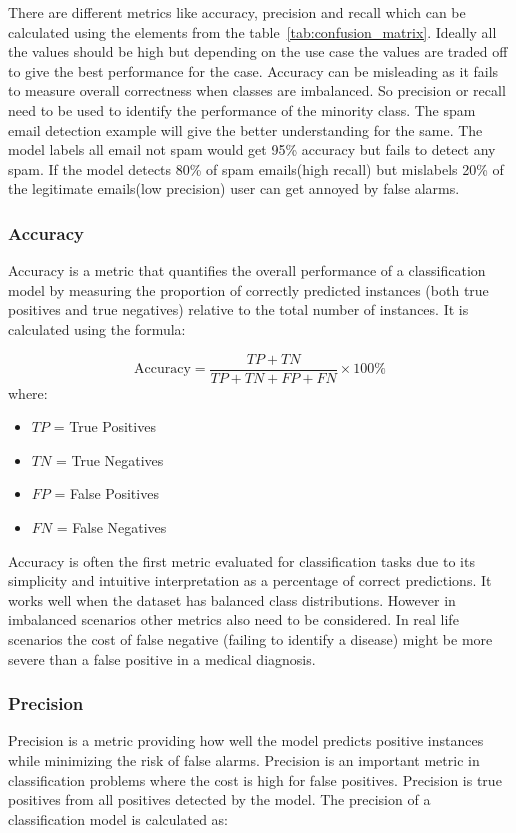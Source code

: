   There are different metrics like accuracy, precision and recall which can be calculated using the elements from the table~\ref{tab:confusion_matrix}. Ideally all the values should be high but depending on the use case the values are traded off to give the best performance for the case. Accuracy can be misleading as it fails to measure overall correctness when classes are imbalanced. So precision or recall need to be used to identify the performance of the minority class. The spam email detection example will give the better understanding for the same. The model labels all email not spam would get 95\% accuracy but fails to detect any spam. If the model detects 80\% of spam emails(high recall) but mislabels 20\% of the legitimate emails(low precision) user can get annoyed by false alarms. 

  \subsubsection{Accuracy}
  Accuracy is a metric that quantifies the overall performance of a classification model by measuring the proportion of correctly predicted instances (both true positives and true negatives) relative to the total number of instances. It is calculated using the formula:

  \begin{equation}
    \text{Accuracy} = \frac{TP + TN}{TP + TN + FP + FN} \times 100\%
    \label{eq:accuracy}
  \end{equation}
  where:
  \begin{itemize}
    \item $TP$ = True Positives
    \item $TN$ = True Negatives
    \item $FP$ = False Positives
    \item $FN$ = False Negatives
  \end{itemize}

  Accuracy is often the first metric evaluated for classification tasks due to its simplicity and intuitive interpretation as a percentage of correct predictions. It works well when the dataset has balanced class distributions. However in imbalanced scenarios other metrics also need to be considered. In real life scenarios the cost of false negative (failing to identify a disease) might be more severe than a false positive in a medical diagnosis.

  \subsubsection{Precision}
  Precision is a metric providing how well the model predicts positive instances while minimizing the risk of false alarms. Precision is an important metric in classification problems where the cost is high for false positives. Precision is true positives from all positives detected by the model. The precision of a classification model is calculated as:

